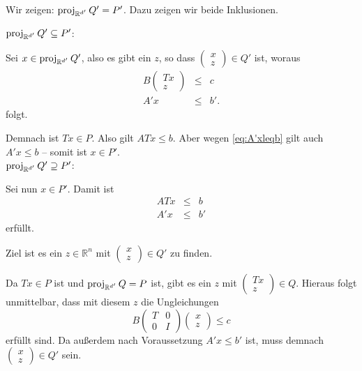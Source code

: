 \documentclass[10p,a4paper,BCOR = 12mm, DIV=15]{scrbook}
\begin{document}
\begin{bew}
Wir zeigen: $\operatorname{proj}_{\mathbb{R}^{d'}} Q' = P'$. Dazu zeigen wir beide Inklusionen.

$\operatorname{proj}_{\mathbb{R}^{d'}} Q' \subseteq P'$: 

Sei $x \in \operatorname{proj}_{\mathbb{R}^{d'}} Q'$, also es gibt ein $z$, so dass $\left(\begin{array}{c}
x \\
z
\end{array}\right) \in Q'$ ist, woraus
\begin{eqnarray}
B \left(\begin{array}{c}
T x \\
z
\end{array}\right) & \leq & c \nonumber \\
A' x & \leq & b'. \label{eq:A'xleqb}
\end{eqnarray}
folgt.

Demnach ist $T x \in P$. Also gilt $A T x \leq b$. Aber wegen \eqref{eq:A'xleqb} gilt auch $A' x \leq b$ -- somit ist $x \in P'$. \\

$\operatorname{proj}_{\mathbb{R}^{d'}} Q' \supseteq P'$: 

Sei nun $x \in P'$.  Damit ist
\begin{eqnarray*}
A T x & \leq & b \\
A' x & \leq & b'
\end{eqnarray*}
erfüllt.

Ziel ist es ein $z \in \mathbb{R}^{n}$ mit $\left(\begin{array}{c}
x \\
z
\end{array}\right) \in Q'$ zu finden.

Da $T x \in P$ ist und $\operatorname{proj}_{\mathbb{R}^{d'}} Q = P$ ist, gibt es ein $z$ mit $\left(\begin{array}{c}
T x \\
z
\end{array}\right) \in Q$. Hieraus folgt unmittelbar, dass mit diesem $z$ die Ungleichungen
\begin{displaymath}
B \left(\begin{array}{cc}
T & 0 \\
0 & I
\end{array}\right) \left(\begin{array}{c}
x \\
z
\end{array}\right) \leq c
\end{displaymath}
erfüllt sind. Da außerdem nach Voraussetzung $A' x \leq b'$ ist, muss demnach $\left(\begin{array}{c}
x \\
z
\end{array}\right) \in Q'$ sein.
\end{bew}
\end{document}
